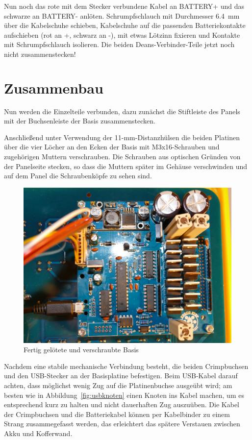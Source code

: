 \documentclass[paper=a4, open=any, numbers=noenddot]{scrbook}
\begin{document}
			Nun noch das rote mit dem Stecker verbundene Kabel an BATTERY+ und das schwarze an BATTERY- anlöten. Schrumpfschlauch mit Durchmesser \SI{6,4}{\milli\metre} über die Kabelschuhe schieben, Kabelschuhe auf die passenden Batteriekontakte aufschieben (rot an +, schwarz an -), mit etwas Lötzinn fixieren und Kontakte mit Schrumpfschlauch isolieren. Die beiden Deans-Verbinder-Teile jetzt noch nicht zusammenstecken!

		\section{Zusammenbau}
			Nun werden die Einzelteile verbunden, dazu zunächst die Stiftleiste des Panels mit der Buchsenleiste der Basis zusammenstecken.

			Anschließend unter Verwendung der 11-mm-Distanzhülsen die beiden Platinen über die vier Löcher an den Ecken der Basis mit M3x16-Schrauben und zugehörigen Muttern verschrauben. Die Schrauben aus optischen Gründen von der Panelseite stecken, so dass die Muttern später im Gehäuse verschwinden und auf dem Panel die Schraubenköpfe zu sehen sind.

			\begin{figure}
				\begin{center}
					\includegraphics[width=\textwidth]{Bilder/base-eingebaut}
				\end{center}
				\caption{Fertig gelötete und verschraubte Basis}
				\label{fig:base-eingebaut}
			\end{figure}

			Nachdem eine stabile mechanische Verbindung besteht, die beiden Crimpbuchsen und den USB-Stecker an der Basisplatine befestigen. Beim USB-Kabel darauf achten, dass möglichst wenig Zug auf die Platinenbuchse ausgeübt wird; am besten wie in Abbildung~\ref{fig:usbknoten} einen Knoten ins Kabel machen, um es entsprechend kurz zu halten und nicht dauerhaften Zug auszuüben. Die Kabel der Crimpbuchsen und die Batteriekabel können per Kabelbinder zu einem Strang zusammegefasst werden, das erleichtert das spätere Verstauen zwischen Akku und Kofferwand.
\end{document}
